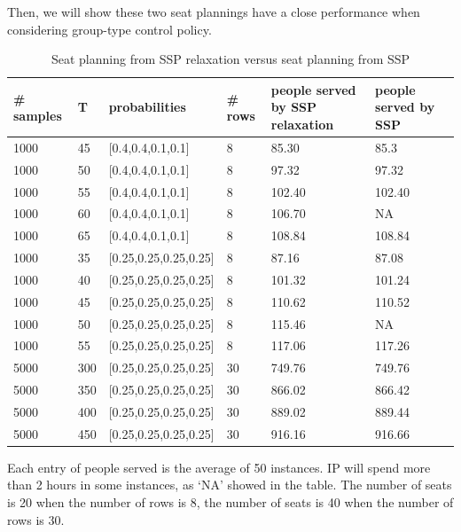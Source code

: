 Then, we will show these two seat plannings have a close performance when considering group-type control policy.

\begin{table}[ht]
    \centering
    \small
    \caption{Seat planning from SSP relaxation versus seat planning from SSP}
    \begin{tabular}{|l|l|l|l|l|l|l|}
    \hline
    \# samples & T & probabilities & \# rows & people served by SSP relaxation & people served by SSP \\
    \hline
    1000  & 45  & [0.4,0.4,0.1,0.1] & 8 & 85.30 & 85.3 \\
    1000  & 50  & [0.4,0.4,0.1,0.1] & 8 & 97.32 & 97.32 \\
    1000  & 55  & [0.4,0.4,0.1,0.1] & 8 & 102.40 & 102.40  \\ %
    1000  & 60  & [0.4,0.4,0.1,0.1] & 8 & 106.70 & NA  \\
    1000  & 65  & [0.4,0.4,0.1,0.1] & 8 & 108.84 & 108.84 \\
    \hline
    1000  & 35  & [0.25,0.25,0.25,0.25] & 8 & 87.16 & 87.08 \\
    1000  & 40  & [0.25,0.25,0.25,0.25] & 8 & 101.32 & 101.24 \\
    1000  & 45  & [0.25,0.25,0.25,0.25] & 8 & 110.62 & 110.52 \\
    1000  & 50  & [0.25,0.25,0.25,0.25] & 8 & 115.46 & NA \\
    1000  & 55  & [0.25,0.25,0.25,0.25] & 8 & 117.06 & 117.26 \\
    \hline
    5000  & 300  & [0.25,0.25,0.25,0.25] & 30 & 749.76 & 749.76 \\
    5000  & 350  & [0.25,0.25,0.25,0.25] & 30 & 866.02 & 866.42 \\
    5000  & 400  & [0.25,0.25,0.25,0.25] & 30 & 889.02 & 889.44 \\
    5000  & 450  & [0.25,0.25,0.25,0.25] & 30 & 916.16 & 916.66 \\
    \hline
    \end{tabular}
\end{table}

Each entry of people served is the average of 50 instances.
IP will spend more than 2 hours in some instances, as `NA' showed in the table.
The number of seats is 20 when the number of rows is 8, the number of seats is 40 when the number of rows is 30.


